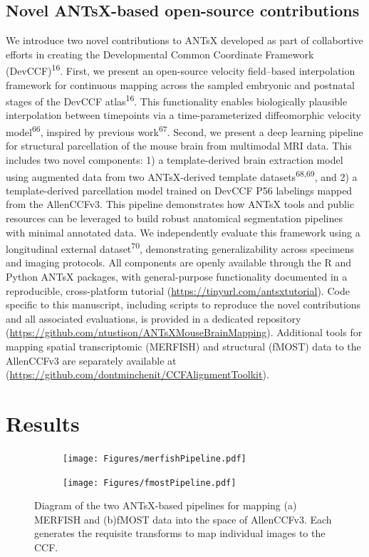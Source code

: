\documentclass[
  12pt,
]{article}
\begin{document}
\subsection{Novel ANTsX-based open-source
contributions}\label{novel-antsx-based-open-source-contributions}

We introduce two novel contributions to ANTsX developed as part of
collabortive efforts in creating the Developmental Common Coordinate
Framework (DevCCF)\textsuperscript{16}. First, we present an open-source
velocity field--based interpolation framework for continuous mapping
across the sampled embryonic and postnatal stages of the DevCCF
atlas\textsuperscript{16}. This functionality enables biologically
plausible interpolation between timepoints via a time-parameterized
diffeomorphic velocity model\textsuperscript{66}, inspired by previous
work\textsuperscript{67}. Second, we present a deep learning pipeline
for structural parcellation of the mouse brain from multimodal MRI data.
This includes two novel components: 1) a template-derived brain
extraction model using augmented data from two ANTsX-derived template
datasets\textsuperscript{68,69}, and 2) a template-derived parcellation
model trained on DevCCF P56 labelings mapped from the AllenCCFv3. This
pipeline demonstrates how ANTsX tools and public resources can be
leveraged to build robust anatomical segmentation pipelines with minimal
annotated data. We independently evaluate this framework using a
longitudinal external dataset\textsuperscript{70}, demonstrating
generalizability across specimens and imaging protocols. All components
are openly available through the R and Python ANTsX packages, with
general-purpose functionality documented in a reproducible,
cross-platform tutorial (\url{https://tinyurl.com/antsxtutorial}). Code
specific to this manuscript, including scripts to reproduce the novel
contributions and all associated evaluations, is provided in a dedicated
repository (\url{https://github.com/ntustison/ANTsXMouseBrainMapping}).
Additional tools for mapping spatial transcriptomic (MERFISH) and
structural (fMOST) data to the AllenCCFv3 are separately available at
(\url{https://github.com/dontminchenit/CCFAlignmentToolkit}).

\clearpage
\newpage

\section{Results}\label{results}

\begin{figure}
\centering
\begin{subfigure}[t]{0.49\textwidth}
\centering
\texttt{[image: Figures/merfishPipeline.pdf]}
\caption{}
\end{subfigure} 
\begin{subfigure}[t]{0.49\textwidth}
\centering
\texttt{[image: Figures/fmostPipeline.pdf]}
\caption{}
\end{subfigure}
\caption{Diagram of the two ANTsX-based pipelines for mapping (a) MERFISH
          and (b)fMOST data into the space of AllenCCFv3.  Each generates
         the requisite transforms to map individual images
         to the CCF.}
\label{fig:allenpipelines}
\end{figure}
\end{document}
